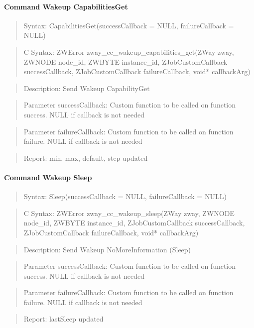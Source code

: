 \paragraph{Command Wakeup CapabilitiesGet}
\begin{quote}Syntax: CapabilitiesGet(successCallback = NULL, failureCallback = NULL)\end{quote}
\begin{quote}C Syntax: ZWError zway\_cc\_wakeup\_capabilities\_get(ZWay zway, ZWNODE node\_id, ZWBYTE instance\_id, ZJobCustomCallback successCallback, ZJobCustomCallback failureCallback, void* callbackArg)\end{quote}
\begin{quote}Description: Send Wakeup CapabilityGet\end{quote}
\begin{quote}Parameter successCallback: Custom function to be called on function success. NULL if callback is not needed\end{quote}
\begin{quote}Parameter failureCallback: Custom function to be called on function failure. NULL if callback is not needed\end{quote}
\begin{quote}Report: min, max, default, step updated\end{quote}

\paragraph{Command Wakeup Sleep}
\begin{quote}Syntax: Sleep(successCallback = NULL, failureCallback = NULL)\end{quote}
\begin{quote}C Syntax: ZWError zway\_cc\_wakeup\_sleep(ZWay zway, ZWNODE node\_id, ZWBYTE instance\_id, ZJobCustomCallback successCallback, ZJobCustomCallback failureCallback, void* callbackArg)\end{quote}
\begin{quote}Description: Send Wakeup NoMoreInformation (Sleep)\end{quote}
\begin{quote}Parameter successCallback: Custom function to be called on function success. NULL if callback is not needed\end{quote}
\begin{quote}Parameter failureCallback: Custom function to be called on function failure. NULL if callback is not needed\end{quote}
\begin{quote}Report: lastSleep updated\end{quote}

